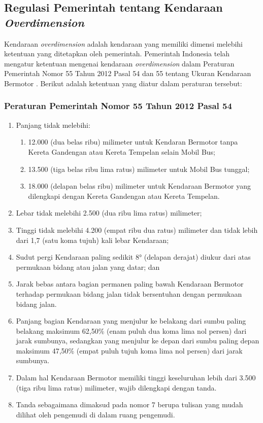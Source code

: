 \subsection{Regulasi Pemerintah tentang Kendaraan \emph{Overdimension}}

Kendaraan \emph{overdimension} adalah kendaraan yang memiliki dimensi melebihi ketentuan yang ditetapkan oleh pemerintah. Pemerintah Indonesia telah mengatur ketentuan mengenai kendaraan \emph{overdimension} dalam Peraturan Pemerintah Nomor 55 Tahun 2012 Pasal 54 dan 55 tentang Ukuran Kendaraan Bermotor \parencite*{ppno55thn2012}. Berikut adalah ketentuan yang diatur dalam peraturan tersebut:

\subsubsection{Peraturan Pemerintah Nomor 55 Tahun 2012 Pasal 54}

\begin{enumerate}
  \item Panjang tidak melebihi:
  \begin{enumerate}
    \item 12.000 (dua belas ribu) milimeter untuk Kendaran Bermotor tanpa Kereta Gandengan atau Kereta Tempelan selain Mobil Bus;
    \item 13.500 (tiga belas ribu lima ratus) milimeter untuk Mobil Bus tunggal;
    \item 18.000 (delapan belas ribu) milimeter untuk Kendaraan Bermotor yang dilengkapi dengan Kereta Gandengan atau Kereta Tempelan.
  \end{enumerate}
  \item Lebar tidak melebihi 2.500 (dua ribu lima ratus)
  milimeter;
  \item Tinggi tidak melebihi 4.200 (empat ribu dua ratus) milimeter dan tidak lebih dari 1,7 (satu koma tujuh) kali lebar Kendaraan;
  \item Sudut pergi Kendaraan paling sedikit 8° (delapan derajat) diukur dari atas permukaan bidang atau jalan yang datar; dan
  \item Jarak bebas antara bagian permanen paling bawah Kendaraan Bermotor terhadap permukaan bidang jalan tidak bersentuhan dengan permukaan bidang jalan.
  \item Panjang bagian Kendaraan yang menjulur ke belakang dari sumbu paling belakang maksimum 62,50\% (enam puluh dua koma lima nol persen) dari jarak sumbunya, sedangkan yang menjulur ke depan dari sumbu paling depan maksimum 47,50\% (empat puluh tujuh koma lima nol persen) dari jarak sumbunya.
  \item Dalam hal Kendaraan Bermotor memiliki tinggi keseluruhan lebih dari 3.500 (tiga ribu lima ratus) milimeter, wajib dilengkapi dengan tanda.
  \item Tanda sebagaimana dimaksud pada nomor 7 berupa tulisan yang mudah dilihat oleh pengemudi di dalam ruang pengemudi.
\end{enumerate}


